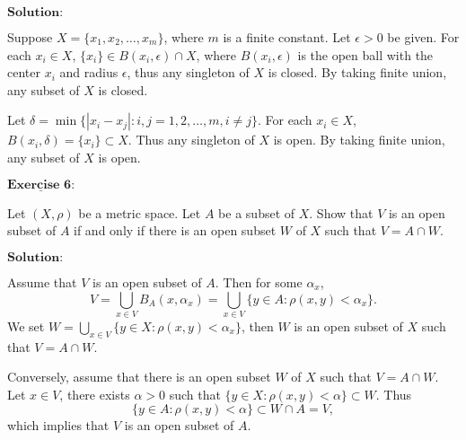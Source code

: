 \documentclass[12pt,a4paper]{ctexart}
\begin{document}
\vspace{8pt}
$\textbf{Solution:}$

Suppose $X = \{x_1, x_2, \dots, x_m \}$, where $m$ is a finite constant. Let $\epsilon > 0$ be given. For each $x_i \in X$, $\{x_i\} \in B(x_i, \epsilon) \cap X$, where $B(x_i, \epsilon)$ is the open ball with the center $x_i$ and radius $\epsilon$, thus any singleton of $X$ is closed. By taking finite union, any subset of $X$ is closed.

Let $\delta = \min \{ |x_i - x_j|: i, j = 1, 2, \dots, m, i \neq j \}$. For each $x_i \in X$, $B(x_i, \delta) = \{x_i\} \subset X$. Thus any singleton of $X$ is open. By taking finite union, any subset of $X$ is open.

\newpage 

$\underline{\textbf{Exercise 6:}}$

Let $(X, \rho)$ be a metric space. Let $A$ be a subset of $X$. Show that $V$ is an open subset of $A$ if and only if there is an open subset $W$ of $X$ such that $V = A \cap W$.

\vspace{8pt}
$\textbf{Solution:}$

Assume that $V$ is an open subset of $A$. Then for some $\alpha_x$,
$$V = \bigcup_{x \in V} B_{A}(x, \alpha_x) = \bigcup_{x \in V} \{y \in A: \rho(x,y) < \alpha_x \}.$$
We set $W = \bigcup_{x \in V} \{y \in X: \rho(x,y) < \alpha_x \}$, then $W$ is an open subset of $X$ such that $V = A \cap W$.

Conversely, assume that there is an open subset $W$ of $X$ such that $V = A \cap W$. Let $x \in V$, there exists $\alpha > 0$ such that $\{y \in X: \rho(x, y) < \alpha\} \subset W$. Thus 
$$\{y \in A: \rho(x,y) < \alpha \} \subset W \cap A = V,$$
which implies that $V$ is an open subset of $A$.
\end{document}
